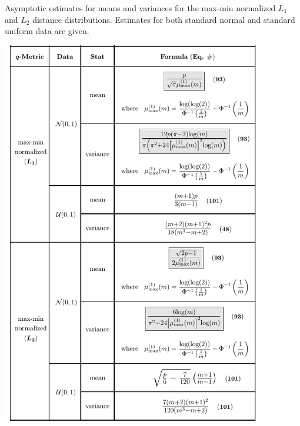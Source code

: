 \documentclass[10pt,letterpaper]{article}\usepackage[]{graphicx}\usepackage[]{color}
\begin{document}
\begin{table}[H]
	\caption{Asymptotic estimates for means and variances for the max-min normalized $L_1$ and $L_2$ distance distributions. Estimates for both standard normal and standard uniform data are given.}
	\label{tab:dist_distr_normalizedL1L2}
	\centering
	\includegraphics[clip,trim=0.27cm 0.0cm 0.0cm 0.05cm,width=0.85\textwidth]{updated_typical_metrics_table(normalized).pdf}
\end{table}
\end{document}
